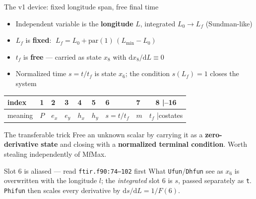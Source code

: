 \documentclass[10pt,aspectratio=169]{beamer}
\newcommand{\code}[1]{\texttt{\small #1}}
\newcommand{\file}[1]{\texttt{\small #1}}
\newcommand{\Lf}{L_f}
\begin{document}
\begin{frame}{The v1 device: fixed longitude span, free final time}

\begin{itemize}
\item Independent variable is the \textbf{longitude} $L$, integrated
      $L_0 \to \Lf$ \hfill (Sundman-like)
\item $\Lf$ is \textbf{fixed}: $\;\Lf = L_0 + \mathrm{par}(1)\,(L_{\min}-L_0)$
\item $t_f$ is \textbf{free} --- carried as state $x_8$ with
      $\mathrm{d}x_8/\mathrm{d}L \equiv 0$
\item Normalized time $s = t/t_f$ is state $x_6$; the condition
      $s(\Lf) = 1$ closes the system
\end{itemize}

\begin{center}\small
\begin{tabular}{@{}llllllllc@{}}
\toprule
index & 1 & 2 & 3 & 4 & 5 & 6 & 7 & 8 \quad|\quad 9--16\\
\midrule
meaning & $P$ & $e_x$ & $e_y$ & $h_x$ & $h_y$ & $s = t/t_f$ & $m$ &
$t_f$ \quad|\quad costates\\
\bottomrule
\end{tabular}
\end{center}

\begin{block}{The transferable trick}
Free an unknown scalar by carrying it as a \textbf{zero-derivative state} and
closing with a \textbf{normalized terminal condition}. Worth stealing
independently of MfMax.
\end{block}

\begin{alertblock}{Slot 6 is aliased --- read \file{ftir.f90:74--102} first}
What \code{Ufun}/\code{Dhfun} see as $x_6$ is overwritten with the longitude
$l$; the \emph{integrated} slot 6 is $s$, passed separately as \code{t}.
\code{Phifun} then scales every derivative by
$\mathrm{d}s/\mathrm{d}L = 1/F(6)$.
\end{alertblock}
\end{frame}
\end{document}
